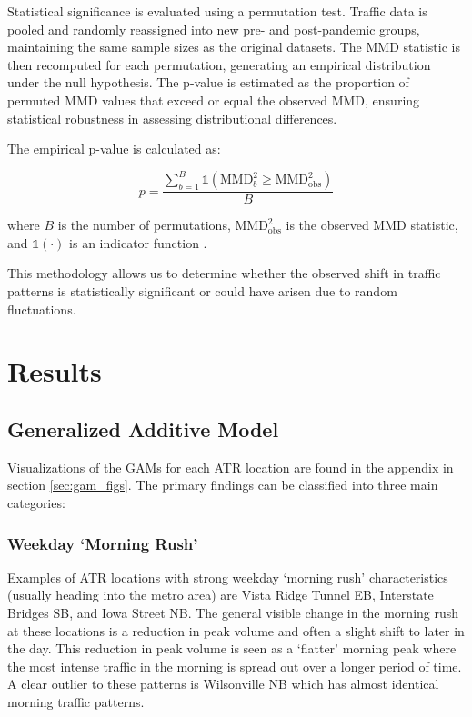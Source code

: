 \documentclass{article}
\begin{document}
Statistical significance is evaluated using a permutation test. Traffic data is pooled and randomly reassigned into new pre- and post-pandemic groups, maintaining the same sample sizes as the original datasets. The MMD statistic is then recomputed for each permutation, generating an empirical distribution under the null hypothesis. The p-value is estimated as the proportion of permuted MMD values that exceed or equal the observed MMD, ensuring statistical robustness in assessing distributional differences.

The empirical p-value is calculated as:

\[
    p = \frac{\sum_{b=1}^{B} \boldsymbol{\mathbb{1}}(\text{MMD}^2_b \geq \text{MMD}^2_{\text{obs}})}{B}
\]

where \( B \) is the number of permutations, \( \text{MMD}^2_{\text{obs}} \) is the observed MMD statistic, and \( \mathbb{1}(\cdot) \) is an indicator function \cite{Gretton2012}.

This methodology allows us to determine whether the observed shift in traffic patterns is statistically significant or could have arisen due to random fluctuations.

\section{Results}

\subsection{Generalized Additive Model}

Visualizations of the GAMs for each ATR location are found in the appendix in section \ref{sec:gam_figs}. The primary findings can be classified into three main categories:

\subsubsection{Weekday `Morning Rush'}

Examples of ATR locations with strong weekday `morning rush' characteristics (usually heading into the metro area) are Vista Ridge Tunnel EB, Interstate Bridges SB, and Iowa Street NB. The general visible change in the morning rush at these locations is a reduction in peak volume and often a slight shift to later in the day. This reduction in peak volume is seen as a `flatter' morning peak where the most intense traffic in the morning is spread out over a longer period of time. A clear outlier to these patterns is Wilsonville NB which has almost identical morning traffic patterns. 
\end{document}
